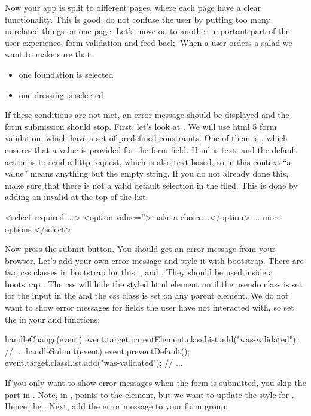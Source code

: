 \documentclass[fleqn, article, a4paper]{memoir}
\begin{document}
\begin{Assignments}
\item Now your app is split to different pages, where each page have a clear functionality. This is good, do not confuse the user by putting too many unrelated things on one page. Let's move on to another important part of the user experience, form validation and feed back. When a user orders a salad we want to make sure that:
\begin{itemize}
  \item one foundation is selected
  \item one dressing is selected
\end{itemize}
If these conditions are not met, an error message should be displayed and the form submission should stop.
First, let's look at . We will use html 5 form validation, which have a set of predefined constraints. One of them is , which ensures that a value is provided for the form field. Html is text, and the default action is to send a http request, which is also text based, so in this context ``a value'' means anything but the empty string. If you do not already done this, make sure that there is not a valid default selection in the  filed. This is done by adding an invalid  at the top of the list:
\begin{Code}
<select required ...>
  <option value=''>make a choice...</option>
  ... more options
</select>
\end{Code}
Now press the submit button. You should get an error message from your browser. Let's add your own error message and style it with bootstrap. There are two css classes in bootstrap for this: , and . They should be used inside a bootstrap . The css will hide the styled html element until the pseudo class  is set for the input in the  and the css class  is set on any parent element. We do not want to show error messages for fields the user have not interacted with, so set the  in your  and  functions:
\begin{Code}
handleChange(event) {
  event.target.parentElement.classList.add("was-validated");
  // ...
}
handleSubmit(event){
  event.preventDefault();
  event.target.classList.add("was-validated");
  // ...
}
\end{Code}
If you only want to show error messages when the form is submitted, you skip the part in . Note, in ,  points to the  element, but we want to update the style for . Hence the . Next, add the error message to your  form group:

\end{Assignments}
\end{document}
